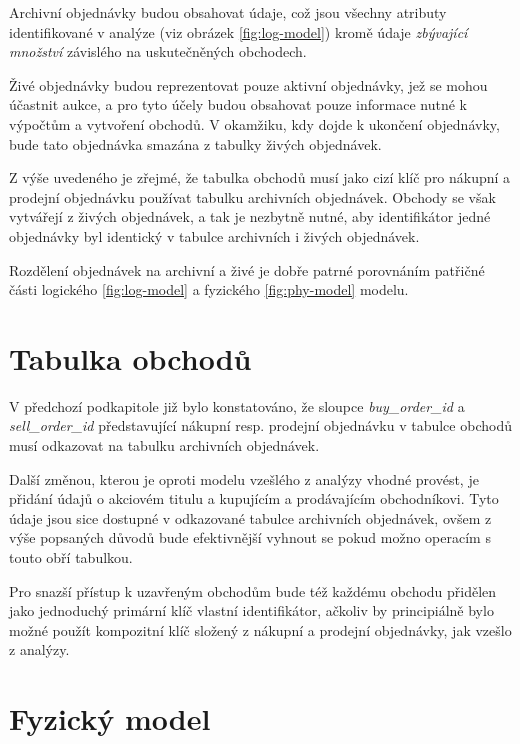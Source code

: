 \documentclass[thesis=M,czech]{FITthesis}[2012/06/26]
\begin{document}
Archivní objednávky budou obsahovat  údaje, což jsou všechny atributy identifikované v analýze (viz obrázek 
\ref{fig:log-model}) kromě údaje \textit{zbývající množství} závislého na uskutečněných obchodech. 

Živé objednávky budou reprezentovat pouze aktivní objednávky, jež se mohou účastnit aukce, a pro tyto účely budou obsahovat 
pouze informace nutné k výpočtům a vytvoření obchodů. V okamžiku, kdy dojde k ukončení objednávky, bude tato objednávka 
smazána z tabulky živých objednávek.

Z výše uvedeného je zřejmé, že tabulka obchodů musí jako cizí klíč pro nákupní a prodejní objednávku používat tabulku archivních 
objednávek. Obchody se však vytvářejí z živých objednávek, a tak je nezbytně nutné, aby identifikátor jedné objednávky byl 
identický v tabulce archivních i živých objednávek.

Rozdělení objednávek na archivní a živé je dobře patrné porovnáním patřičné části logického \ref{fig:log-model} a 
fyzického \ref{fig:phy-model} modelu. 


\section{Tabulka obchodů}

V předchozí podkapitole již bylo konstatováno, že sloupce \textit{buy\_order\_id} a \textit{sell\_order\_id} představující nákupní resp. 
prodejní objednávku v tabulce obchodů musí odkazovat na tabulku archivních objednávek. 

Další změnou, kterou je oproti modelu vzešlého z analýzy vhodné provést, je přidání údajů o akciovém titulu a kupujícím a prodávajícím 
obchodníkovi. Tyto údaje jsou sice dostupné v odkazované tabulce archivních objednávek, ovšem z výše popsaných důvodů bude 
efektivnější vyhnout se pokud možno operacím s touto obří tabulkou. 

Pro snazší přístup k uzavřeným obchodům bude též každému obchodu přidělen jako jednoduchý primární klíč vlastní identifikátor, ačkoliv
by principiálně bylo možné použít kompozitní klíč složený z nákupní a prodejní objednávky, jak vzešlo z analýzy.


\section{Fyzický model}
\end{document}
